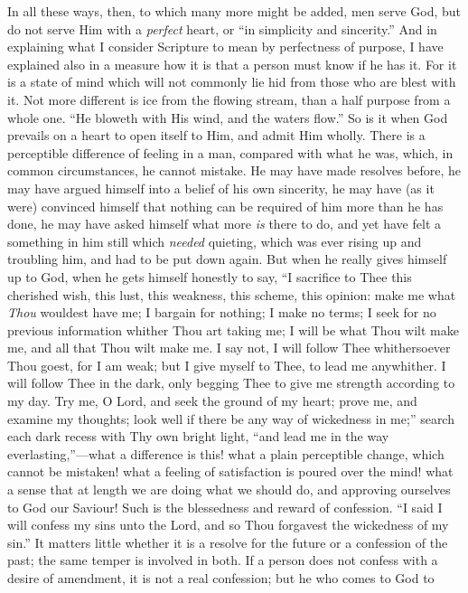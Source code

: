 In all these ways, then, to which many more might be added, men
serve God, but do not serve Him with a \emph{perfect} heart, or ``in
simplicity and sincerity.'' And in explaining what I consider
Scripture to mean by perfectness of purpose, I have explained also in
a measure how it is that a person must know if he has it. For it is a
state of mind which will not commonly lie hid from those who are blest
with it. Not more different is ice from the flowing stream, than a
half purpose from a whole one. ``He bloweth with His wind, and the
waters flow.'' So is it when God prevails on a heart to open
itself to Him, and admit Him wholly. There is a perceptible difference
of feeling in a man, compared with what he was, which, in common
circumstances, he cannot mistake. He may have made resolves before, he
may have argued himself into a belief of his own sincerity, he may
have (as it were) convinced himself that nothing can be required of
him more than he has done, he may have asked himself what more \emph{is}
there to do, and yet have felt a something in him still which \emph{needed}
quieting, which was ever rising up and troubling him, and had to be
put down again. But when he really gives himself up to God, when he
gets himself honestly to say, ``I sacrifice to Thee this cherished
wish, this lust, this weakness, this scheme, this opinion: make me
what \emph{Thou} wouldest have me; I bargain for nothing; I make no
terms; I seek for no previous information whither Thou art taking me;
I will be what Thou wilt make me, and all that Thou wilt make me. I
say not, I will follow Thee whithersoever Thou goest, for I am weak;
but I give myself to Thee, to lead me anywhither. I will follow Thee
in the dark, only begging Thee to give me strength according to my
day. Try me, O Lord, and seek the ground of my heart; prove me, and
examine my thoughts; look well if there be any way of wickedness in
me;'' search each dark recess with Thy own bright light, ``and
lead me in the way everlasting,''—what a difference is this!
what a plain perceptible change, which cannot be mistaken! what a
feeling of satisfaction is poured over the mind! what a sense that at
length we are doing what we should do, and approving ourselves to God
our Saviour! Such is the blessedness and reward of confession. ``I
said I will confess my sins unto the Lord, and so Thou forgavest the
wickedness of my sin.'' It matters little whether it is a resolve
for the future or a confession of the past; the same temper is
involved in both. If a person does not confess with a desire of
amendment, it is not a real confession; but he who comes to God to
